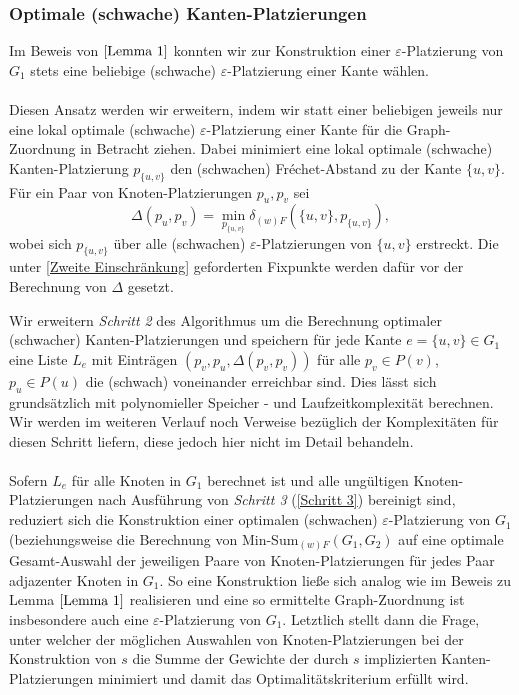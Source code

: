 \documentclass[a4paper, 12pt, twoside]{article}
\theoremstyle{Format1} %
\begin{document}
\subsubsection{Optimale (schwache) Kanten-Platzierungen}
Im Beweis von $\ref{Lemma 1}$ konnten wir zur Konstruktion einer $\varepsilon$-Platzierung von $G_1$ stets eine beliebige (schwache) $\varepsilon$-Platzierung einer Kante wählen.
\\
\\
Diesen Ansatz werden wir erweitern, indem wir statt einer beliebigen jeweils nur eine lokal optimale (schwache) $\varepsilon$-Platzierung einer Kante für
die Graph-Zuordnung in Betracht ziehen.
Dabei minimiert eine lokal optimale (schwache) Kanten-Platzierung $p_{\{u,v\}}$ den (schwachen) Fréchet-Abstand zu der Kante $\{u,v\}$.
Für ein Paar von Knoten-Platzierungen $p_u, p_v$ sei $$\Delta(p_u,p_v) = \min_{p_{{\{u,v}\}}} \delta_{(w)F}(\{u,v\},p_{\{u,v\}}),$$ wobei sich $p_{{\{u,v}\}}$ über alle
(schwachen) $\varepsilon$-Platzierungen von $\{u,v\}$ erstreckt. Die unter \ref{Zweite Einschränkung} geforderten Fixpunkte werden dafür vor der Berechnung von $\Delta$ gesetzt.

Wir erweitern \textit{Schritt 2} des Algorithmus um die Berechnung optimaler (schwacher) Kanten-Platzierungen und speichern für jede Kante $e=\{u,v\} \in G_1$ eine Liste $L_e$
mit Einträgen $(p_v, p_u, \Delta(p_v,p_v))$ für alle $p_v \in P(v)$, $p_u \in P(u)$ die (schwach) voneinander erreichbar sind. Dies lässt sich grundsätzlich mit polynomieller
Speicher - und Laufzeitkomplexität berechnen. Wir werden im weiteren Verlauf noch Verweise bezüglich der Komplexitäten für diesen Schritt liefern,
diese jedoch hier nicht im Detail behandeln.
\\
\\
Sofern $L_e$ für alle Knoten in $G_1$ berechnet ist und alle ungültigen Knoten-Platzierungen nach Ausführung von \textit{Schritt 3} (\ref{Schritt 3}) bereinigt sind,
reduziert sich die Konstruktion einer optimalen (schwachen) $\varepsilon$-Platzierung von $G_1$ (beziehungsweise die Berechnung von Min-Sum$_{(w)F}(G_1,G_2)$ auf eine optimale Gesamt-Auswahl
der jeweiligen Paare von Knoten-Platzierungen für jedes Paar adjazenter Knoten in $G_1$.
So eine Konstruktion ließe sich analog wie im Beweis zu Lemma $\ref{Lemma 1}$ realisieren und eine so ermittelte Graph-Zuordnung ist insbesondere auch eine $\varepsilon$-Platzierung von $G_1$.
Letztlich stellt dann die Frage, unter welcher der möglichen Auswahlen von Knoten-Platzierungen bei der Konstruktion von $s$ die Summe der Gewichte der durch $s$ implizierten Kanten-Platzierungen
minimiert und damit das Optimalitätskriterium erfüllt wird.
\end{document}
